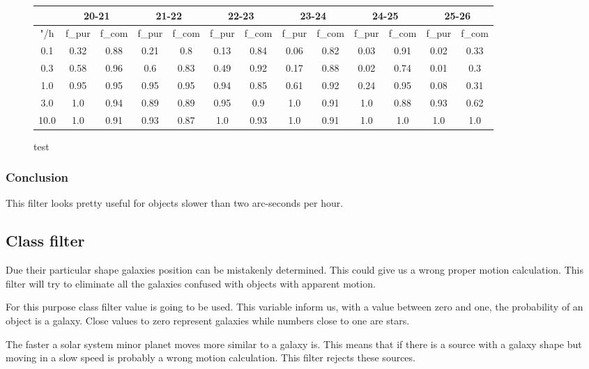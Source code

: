 \documentclass{article}
\begin{document}
\begin{figure}[H]
\centering
\begin{tabular}{|c|c|c|c|c|c|c|c|c|c|c|c|c|}
\hline
\multicolumn{1}{|c|}{} & \multicolumn{2}{|c|}{20-21} & \multicolumn{2}{|c|}{21-22} & \multicolumn{2}{|c|}{22-23} & \multicolumn{2}{|c|}{23-24} & \multicolumn{2}{|c|}{24-25} & \multicolumn{2}{|c|}{25-26}\\
\hline \hline
"/h & f\_pur & f\_com & f\_pur & f\_com & f\_pur & f\_com & f\_pur & f\_com & f\_pur & f\_com & f\_pur & f\_com \\
\hline
0.1 & 0.32 & 0.88 & 0.21 & 0.8 & 0.13 & 0.84 & 0.06 & 0.82 & 0.03 & 0.91 & 0.02 & 0.33\\
\hline
0.3 & 0.58 & 0.96 & 0.6 & 0.83 & 0.49 & 0.92 & 0.17 & 0.88 & 0.02 & 0.74 & 0.01 & 0.3\\
\hline
1.0 & 0.95 & 0.95 & 0.95 & 0.95 & 0.94 & 0.85 & 0.61 & 0.92 & 0.24 & 0.95 & 0.08 & 0.31\\
\hline
3.0 & 1.0 & 0.94 & 0.89 & 0.89 & 0.95 & 0.9 & 1.0 & 0.91 & 1.0 & 0.88 & 0.93 & 0.62\\
\hline
10.0 & 1.0 & 0.91 & 0.93 & 0.87 & 1.0 & 0.93 & 1.0 & 0.91 & 1.0 & 1.0 & 1.0 & 1.0\\
\hline
\end{tabular}
\caption{test}
\end{figure}

\subsubsection{Conclusion}
This filter looks pretty useful for objects slower than two arc-seconds per hour.

\subsection{Class filter}
Due their particular shape galaxies position can be mistakenly determined. This could give us a wrong proper motion calculation. This filter will try to eliminate all the galaxies confused with objects with apparent motion.
\par For this purpose class filter value is going to be used. This variable inform us, with a value between zero and one, the probability of an object is a galaxy. Close values to zero represent galaxies while numbers close to one are stars.
\par The faster a solar system minor planet moves more similar to a galaxy is. This means that if there is a source with a galaxy shape but moving in a slow speed is probably a wrong motion calculation. This filter rejects these sources.
\end{document}
